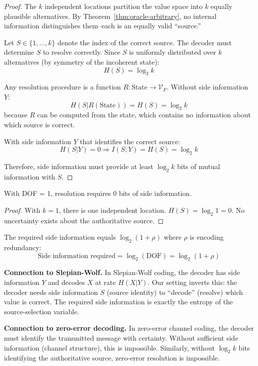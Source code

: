 \begin{proof}
The $k$ independent locations partition the value space into $k$ equally plausible alternatives. By Theorem~\ref{thm:oracle-arbitrary}, no internal information distinguishes them--each is an equally valid ``source.''

Let $S \in \{1, \ldots, k\}$ denote the index of the correct source. The decoder must determine $S$ to resolve correctly. Since $S$ is uniformly distributed over $k$ alternatives (by symmetry of the incoherent state):
\[
H(S) = \log_2 k
\]

Any resolution procedure is a function $R: \text{State} \to \mathcal{V}_F$. Without side information $Y$:
\[
H(S | R(\text{State})) = H(S) = \log_2 k
\]
because $R$ can be computed from the state, which contains no information about which source is correct.

With side information $Y$ that identifies the correct source:
\[
H(S | Y) = 0 \Rightarrow I(S; Y) = H(S) = \log_2 k
\]

Therefore, side information must provide at least $\log_2 k$ bits of mutual information with $S$.
\end{proof}

\begin{corollary}[DOF = 1 Requires Zero Side Information]\label{cor:dof1-zero-side}
With DOF = 1, resolution requires 0 bits of side information.
\end{corollary}

\begin{proof}
With $k = 1$, there is one independent location. $H(S) = \log_2 1 = 0$. No uncertainty exists about the authoritative source.
\end{proof}

\begin{corollary}\label{cor:side-info-redundancy}
The required side information equals $\log_2(1 + \rho)$ where $\rho$ is encoding redundancy:
\[
\text{Side information required} = \log_2(\text{DOF}) = \log_2(1 + \rho)
\]
\end{corollary}

\textbf{Connection to Slepian-Wolf.} In Slepian-Wolf coding, the decoder has side information $Y$ and decodes $X$ at rate $H(X|Y)$. Our setting inverts this: the decoder needs side information $S$ (source identity) to ``decode'' (resolve) which value is correct. The required side information is exactly the entropy of the source-selection variable.

\textbf{Connection to zero-error decoding.} In zero-error channel coding, the decoder must identify the transmitted message with certainty. Without sufficient side information (channel structure), this is impossible. Similarly, without $\log_2 k$ bits identifying the authoritative source, zero-error resolution is impossible.

